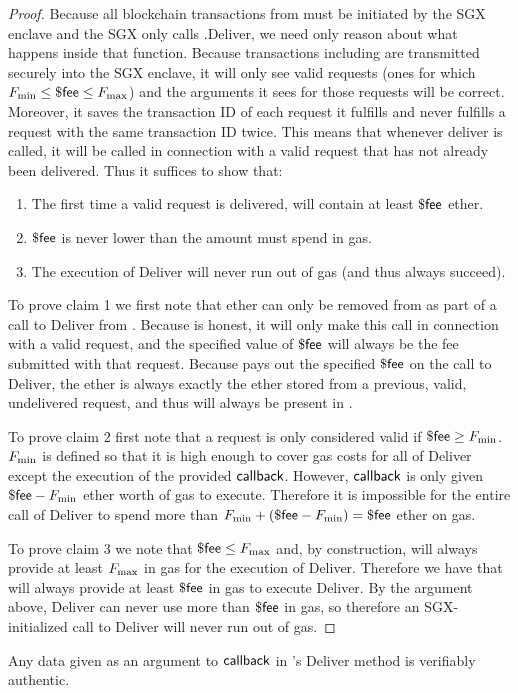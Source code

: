 \begin{proof}

Because all blockchain transactions from \sgxadd must be initiated by the SGX enclave and the SGX only calls \tcont.Deliver,
we need only reason about what happens inside that function.
Because transactions including \tcont are transmitted securely into the SGX enclave, it will only see valid requests (ones for which $F_{\rm min} \leq \${\sf fee} \leq F_{\rm max}$) and the arguments it sees for those requests will be correct.
Moreover, it saves the transaction ID of each request it fulfills and never fulfills a request with the same transaction ID twice.
This means that whenever deliver is called, it will be called in connection with a valid request that has not already been delivered.
Thus it suffices to show that:
\begin{enumerate}
  \item The first time a valid request is delivered, \tcont will contain at least $\${\sf fee}$ ether.
  \item $\${\sf fee}$ is never lower than the amount \sgxadd must spend in gas.
  \item The execution of Deliver will never run out of gas (and thus always succeed).
\end{enumerate}

To prove claim 1 we first note that ether can only be removed from \tcont as part of a call to Deliver from \sgxadd.
Because \sgxadd is honest, it will only make this call in connection with a valid request, and the specified value of $\${\sf fee}$ will always be the fee submitted with that request.
Because \tcont pays out the specified $\${\sf fee}$ on the call to Deliver, the ether is always exactly the ether stored from a previous, valid, undelivered request, and thus will always be present in \tcont.

To prove claim 2 first note that a request is only considered valid if $\${\sf fee} \geq F_{\rm min}$.
$F_{\rm min}$ is defined so that it is high enough to cover gas costs for all of Deliver except the execution of the provided ${\sf callback}$.
However, ${\sf callback}$ is only given $\${\sf fee} - F_{\rm min}$ ether worth of gas to execute.
Therefore it is impossible for the entire call of Deliver to spend more than $F_{\rm min} + (\${\sf fee} - F_{\rm min}) = \${\sf fee}$ ether on gas.

To prove claim 3 we note that $\${\sf fee} \leq F_{\rm max}$ and, by construction, \sgxadd will always provide at least $F_{\rm max}$ in gas for the execution of Deliver.
Therefore we have that \sgxadd will always provide at least $\${\sf fee}$ in gas to execute Deliver.
By the argument above, Deliver can never use more than $\${\sf fee}$ in gas, so therefore an SGX-initialized call to Deliver will never run out of gas.
\end{proof}



\begin{lemma} \label{lem:authentic-delivery}
Any data given as an argument to ${\sf callback}$ in \tcont's Deliver method is verifiably authentic.
\end{lemma}



